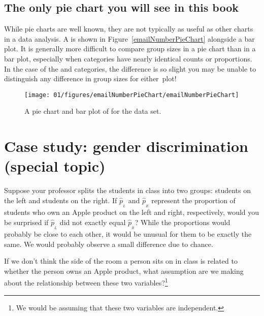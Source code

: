 \subsection{The only pie chart you will see in this book}

While pie charts are well known, they are not typically as useful as other charts in a data analysis. A  is shown in Figure~\vref{emailNumberPieChart} alongside a bar plot. It is generally more difficult to compare group sizes in a pie chart than in a bar plot, especially when categories have nearly identical counts or proportions. In the case of the  and  categories, the difference is so slight you may be unable to distinguish any difference in group sizes for either~plot!

\begin{figure}
   \centering
   \texttt{[image: 01/figures/emailNumberPieChart/emailNumberPieChart]}
   \caption{A pie chart and bar plot of  for the  data set.}
   \label{emailNumberPieChart}
\end{figure}



\section{Case study: gender discrimination (special topic)}
\label{caseStudyGenderDiscrimination}


\begin{example}{Suppose your professor splits the students in class into two groups: students on the left and students on the right. If $\hat{p}_{_L}$ and $\hat{p}_{_R}$ represent the proportion of students who own an Apple product on the left and right, respectively, would you be surprised if $\hat{p}_{_L}$ did not {exactly} equal $\hat{p}_{_R}$?}\label{classRightLeftSideApple}
While the proportions would probably be close to each other, it would be unusual for them to be exactly the same. We would probably observe a small difference due to {chance}.
\end{example}

\begin{exercise}
If we don't think the side of the room a person sits on in class is related to whether the person owns an Apple product, what assumption are we making about the relationship between these two variables?\footnote{We would be assuming that these two variables are independent.}
\end{exercise}

